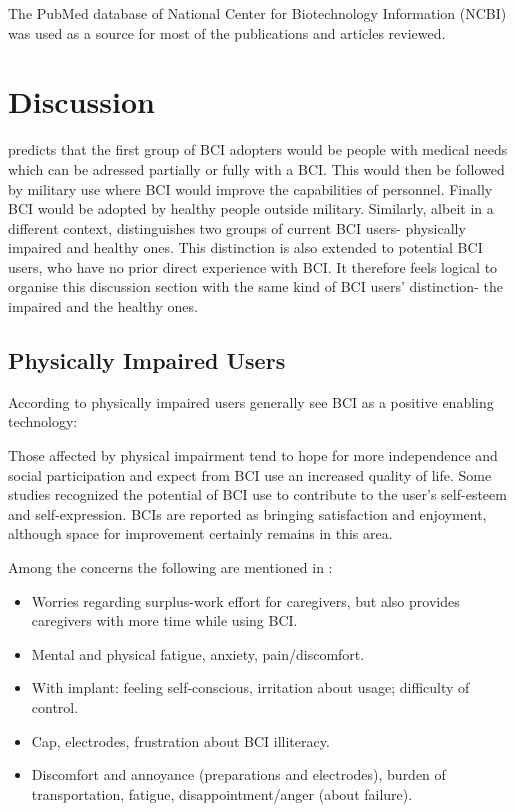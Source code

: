 \documentclass[fleqn,11pt]{olplainarticle}
\begin{document}
The PubMed database of  National Center for Biotechnology Information (NCBI) was used as a source for most of the publications and articles reviewed.

\section{Discussion}
\cite{schalk2008brain} predicts that the first group of BCI adopters would be people with medical needs which can be adressed partially or fully with a BCI. This would then be followed by military use where BCI would improve the capabilities of personnel. Finally BCI would be adopted by healthy people outside military. Similarly, albeit in a different context, \cite{kogel2019using} distinguishes two groups of current BCI users- physically impaired and healthy ones. This distinction is also extended to potential BCI users, who have no prior direct experience with BCI. It therefore feels logical to organise this discussion section with the same kind of BCI users' distinction- the impaired and the healthy ones.

\subsection{Physically Impaired Users}
According to \cite{kogel2019using} physically impaired users generally see BCI as a positive enabling technology:
\begin{displayquote}
    Those affected by physical impairment tend to hope for more independence and social participation and expect from BCI use an increased quality of life. Some studies recognized the potential of BCI use to contribute to the user’s self-esteem and self-expression. BCIs are reported as bringing satisfaction and enjoyment, although space for improvement certainly remains in this area.
\end{displayquote}

Among the concerns the following are mentioned in \cite{kogel2019using}:
\begin{displayquote}
    \begin{itemize}
        \item Worries regarding surplus-work effort for caregivers, but also provides caregivers with more time while using BCI.
        \item Mental and physical fatigue, anxiety, pain/discomfort.
        \item With implant: feeling self-conscious, irritation about usage; difficulty of control.
        \item Cap, electrodes, frustration about BCI illiteracy.
        \item Discomfort and annoyance (preparations and electrodes), burden of transportation, fatigue, disappointment/anger (about failure).
    \end{itemize}
\end{displayquote}
\end{document}
